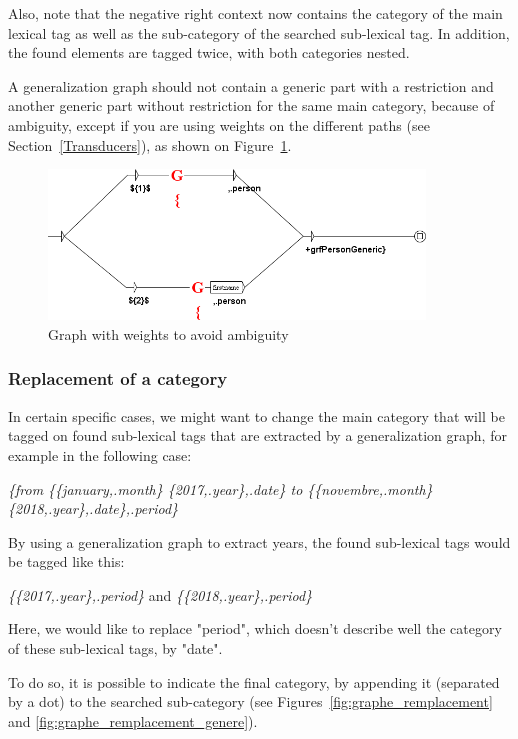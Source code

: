 \bigskip
\noindent Also, note that the negative right context now contains the category of the main
lexical tag as well as the sub-category of the searched sub-lexical tag. In addition, the found elements are
tagged twice, with both categories nested.

\bigskip
\noindent A generalization graph should not contain a generic part with a restriction and another generic part
without restriction for the same main category, because of ambiguity, except if you are using weights
on the different paths (see Section~\ref{Transducers}), as shown on Figure~\ref{fig:graphe_poids}.

\begin{figure}[!htb]
  \centering
  \includegraphics[width=10cm]{resources/img/graphe_poids.png}
  \caption{Graph with weights to avoid ambiguity}
  \label{fig:graphe_poids}
\end{figure}

\bigskip
\subsubsection{Replacement of a category}
In certain specific cases, we might want to change the main category that will be tagged on found
sub-lexical tags that are extracted by a generalization graph, for example in the following case:

\bigskip
\noindent
\emph{\{from \{\{january,.month\} \{2017,.year\},.date\} to \{\{novembre,.month\} \{2018,.year\},.date\},.period\}}


\bigskip
\noindent By using a generalization graph to extract years, the found sub-lexical tags would be tagged like this:

\bigskip
\emph{\{\{2017,.year\},.period\}} and \emph{\{\{2018,.year\},.period\}}

\bigskip
\noindent Here, we would like to replace "period", which doesn't describe well the category
of these sub-lexical tags, by "date".

\bigskip
\noindent To do so, it is possible to indicate the final category, by appending it (separated by a dot)
to the searched sub-category (see Figures~\ref{fig:graphe_remplacement} and
\ref{fig:graphe_remplacement_genere}).


